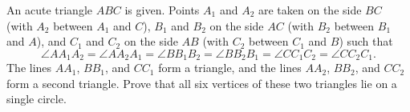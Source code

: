 An acute triangle $ABC$ is given. Points $A_1$ and $A_2$ are taken on the side $BC$ (with $A_2$ between $A_1$ and $C$), $B_1$ and $B_2$ on the side $AC$ (with $B_2$ between $B_1$ and $A$), and $C_1$ and $C_2$ on the side $AB$ (with $C_2$ between $C_1$ and $B$) such that
\[ \angle AA_1A_2 = \angle AA_2A_1 = \angle BB_1B_2 = \angle BB_2B_1 = \angle CC_1C_2 = \angle CC_2C_1. \]
The lines $AA_1$, $BB_1$, and $CC_1$ form a triangle, and the lines $AA_2$, $BB_2$, and $CC_2$ form a second triangle. Prove that all six vertices of these two triangles lie on a single circle.
